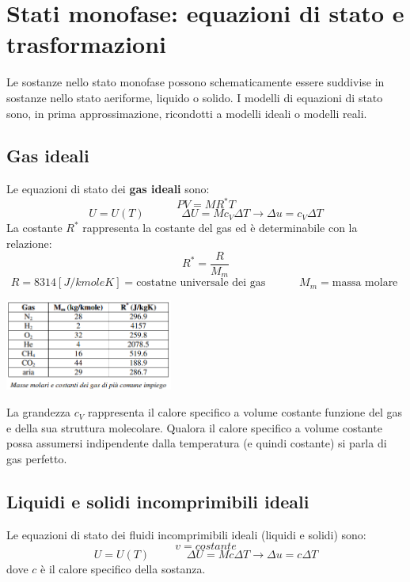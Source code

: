 \section{Stati monofase: equazioni di stato e trasformazioni}
Le sostanze nello stato monofase possono schematicamente essere suddivise in sostanze nello
stato aeriforme, liquido o solido. I modelli di equazioni di stato sono, in prima
approssimazione, ricondotti a modelli ideali o modelli reali.
\subsection{Gas ideali}
Le equazioni di stato dei \textbf{gas ideali} sono:
\[
    PV=MR^*T
\]
\[
    U=U(T) \;\;\;\;\;\;\;\;\;\;\;\;\Delta U = M c_V \Delta T \rightarrow \Delta u = c_V \Delta T
\]
La costante $R^*$ rappresenta la costante del gas ed è determinabile con la relazione:
\[
    R^* = \frac{R}{M_m}
\]
\[
    R=8314 [J/kmole K] =\text{costatne universale dei gas}\; \;\;\;\;\;\;\;\;\;\;M_m = \text{massa molare}\;
\]
\begin{center}
    \includegraphics[height=3cm]{../NOTE SUGLI ESERCIZI/img1.PNG}
\end{center}
La grandezza $c_V$ rappresenta il calore specifico a volume costante funzione del gas e della sua
struttura molecolare. Qualora il calore specifico a volume costante possa assumersi indipendente dalla temperatura (e quindi costante) si parla di gas perfetto.
\subsection{Liquidi e solidi incomprimibili ideali}
Le equazioni di stato dei fluidi incomprimibili ideali (liquidi e solidi) sono:
\[
    v = costante
\]
\[
    U=U(T)  \;\;\;\;\;\;\;\;\;\;\;\;\Delta U = M c \Delta T \rightarrow \Delta u = c \Delta T
\]
dove $c$ è il calore specifico della sostanza.
